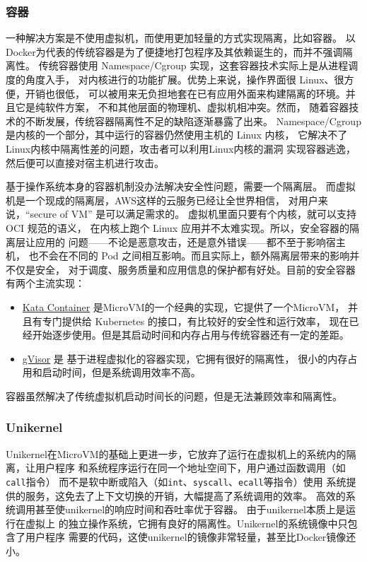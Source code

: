 \documentclass{../runikraft-report}
\begin{document}
\subsubsection{容器}
一种解决方案是不使用虚拟机，而使用更加轻量的方式实现隔离，比如容器。
以Docker为代表的传统容器是为了便捷地打包程序及其依赖诞生的，而并不强调隔离性。
传统容器使用 Namespace/Cgroup 实现，这套容器技术实际上是从进程调度的角度入手，
对内核进行的功能扩展。优势上来说，操作界面很 Linux、很方便，开销也很低，
可以被用来无负担地套在已有应用外面来构建隔离的环境。并且它是纯软件方案，
不和其他层面的物理机、虚拟机相冲突。然而，
随着容器技术的不断发展，传统容器隔离性不足的缺陷逐渐暴露了出来。
Namespace/Cgroup 是内核的一个部分，其中运行的容器仍然使用主机的 Linux 内核，
它解决不了Linux内核中隔离性差的问题，攻击者可以利用Linux内核的漏洞
实现容器逃逸，然后便可以直接对宿主机进行攻击。\cite{bib:docker-security-selinux}

基于操作系统本身的容器机制没办法解决安全性问题，需要一个隔离层。
而虚拟机是一个现成的隔离层，AWS这样的云服务已经让全世界相信，
对用户来说，“secure of VM” 是可以满足需求的。
虚拟机里面只要有个内核，就可以支持 OCI 规范的语义，
在内核上跑个 Linux 应用并不太难实现。所以，安全容器的隔离层让应用的
问题——不论是恶意攻击，还是意外错误——都不至于影响宿主机，
也不会在不同的 Pod 之间相互影响。而且实际上，额外隔离层带来的影响并不仅是安全，
对于调度、服务质量和应用信息的保护都有好处。目前的安全容器有两个主流实现：
\begin{itemize}
\item \href{https://github.com/kata-containers/kata-containers}{Kata Container} 是MicroVM的一个经典的实现，它提供了一个MicroVM，
并且有专门提供给 Kubernetes 的接口，有比较好的安全性和运行效率，
现在已经开始逐步使用。但是其启动时间和内存占用与传统容器还有一定的差距。
\item  \href{https://github.com/google/gvisor}{gVisor} 是
基于进程虚拟化的容器实现，它拥有很好的隔离性，
很小的内存占用和启动时间，但是系统调用效率不高。
\end{itemize}

容器虽然解决了传统虚拟机启动时间长的问题，但是无法兼顾效率和隔离性。

\subsubsection{Unikernel}
Unikernel在MicroVM的基础上更进一步，它放弃了运行在虚拟机上的系统内的隔离，让用户程序
和系统程序运行在同一个地址空间下，用户通过函数调用（如\texttt{call}指令）
而不是软中断或陷入（如\texttt{int}、\texttt{syscall}、\texttt{ecall}等指令）使用
系统提供的服务，这免去了上下文切换的开销，大幅提高了系统调用的效率。
高效的系统调用甚至使unikernel的响应时间和吞吐率优于容器。
由于unikernel本质上是运行在虚拟上
的独立操作系统，它拥有良好的隔离性。Unikernel的系统镜像中只包含了用户程序
需要的代码，这使unikernel的镜像非常轻量，甚至比Docker镜像还小。
\end{document}
